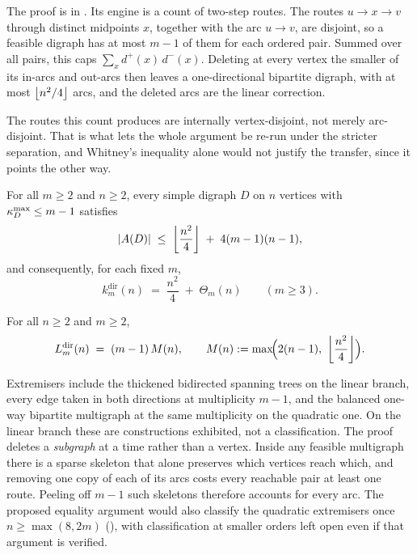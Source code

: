 The proof is in . Its engine is a count of two-step routes. The routes $u \to x \to v$ through distinct midpoints $x$, together with the arc $u \to v$, are disjoint, so a feasible digraph has at most $m-1$ of them for each ordered pair. Summed over all pairs, this caps $\sum_x d^+(x)\,d^-(x)$. Deleting at every vertex the smaller of its in-arcs and out-arcs then leaves a one-directional bipartite digraph, with at most $\left\lfloor n^2/4 \right\rfloor$ arcs, and the deleted arcs are the linear correction.

The routes this count produces are internally vertex-disjoint, not merely arc-disjoint. That is what lets the whole argument be re-run under the stricter separation, and Whitney's inequality alone would not justify the transfer, since it points the other way.

\begin{theorem}\label{thm:dir-vertex-linear-error}
For all $m \ge 2$ and $n \ge 2$, every simple digraph $D$ on $n$ vertices with $\kappa^{\max}_D \le m-1$ satisfies
\[
    |A(D)| \;\le\; \left\lfloor \frac{n^2}{4} \right\rfloor \;+\; 4(m-1)(n-1),
\]
and consequently, for each fixed $m$,
\[
    k_m^{\mathrm{dir}}(n) \;=\; \frac{n^2}{4} \;+\; \Theta_m(n) \qquad (m\ge3).
\]
\end{theorem}

\begin{theorem}\label{thm:dir-multi-full}
For all $n \ge 2$ and $m \ge 2$,
\[
    L_m^{\mathrm{dir}}(n) \;=\; (m-1)\,M(n), \qquad M(n) := \max\!\Bigl(2(n-1),\ \floorfrac{n^2}{4}\Bigr).
\]
\end{theorem}

Extremisers include the thickened bidirected spanning trees on the linear branch, every edge taken in both directions at multiplicity $m-1$, and the balanced one-way bipartite multigraph at the same multiplicity on the quadratic one. On the linear branch these are constructions exhibited, not a classification. The proof deletes a \emph{subgraph} at a time rather than a vertex. Inside any feasible multigraph there is a sparse skeleton that alone preserves which vertices reach which, and removing one copy of each of its arcs costs every reachable pair at least one route. Peeling off $m-1$ such skeletons therefore accounts for every arc. The proposed equality argument would also classify the quadratic extremisers once $n\ge\max(8,2m)$ (), with classification at smaller orders left open even if that argument is verified.

